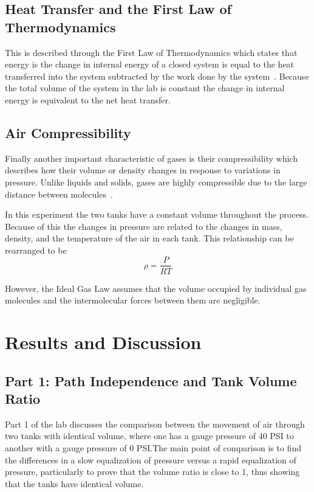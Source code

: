 \documentclass[12pt,letterpaper]{article}
\begin{document}
\subsection{Heat Transfer and the First Law of Thermodynamics}

This is described through the First Law of Thermodynamics
which states that energy is the change in internal energy
of a closed system is equal to the heat transferred into
the system subtracted by the work done by the system~\cite{chandra2016}.
Because the total volume of the system in the lab is
constant the change in internal energy is equivalent
to the net heat transfer.

\subsection{Air Compressibility}

Finally another important characteristic of gases is
their compressibility which describes how their volume
or density changes in response to variations in pressure.
Unlike liquids and solids, gases are highly compressible
due to the large distance between molecules~\cite{alraeei2020}.

In this experiment the two tanks have a constant volume
throughout the process. Because of this the changes in
pressure are related to the changes in mass, density,
and the temperature of the air in each tank. This
relationship can be rearranged to be
\begin{equation}
    \rho = \frac{P}{RT}
\end{equation}


However, the Ideal Gas Law assumes that the volume
occupied by individual gas molecules and the
intermolecular forces between them are negligible.

\section{Results and Discussion}

\subsection{Part 1: Path Independence and Tank Volume Ratio}

Part 1 of the lab discusses the comparison between the movement of air through two tanks with identical volume, where
one has a gauge pressure of 40 PSI to another with a gauge pressure of 0 PSI.\@ The main point of comparison
is to find the differences in a slow equalization of pressure versus a rapid equalization of pressure, particularly to prove that the volume ratio is close to 1,
thus showing that the tanks have identical volume.
\end{document}
